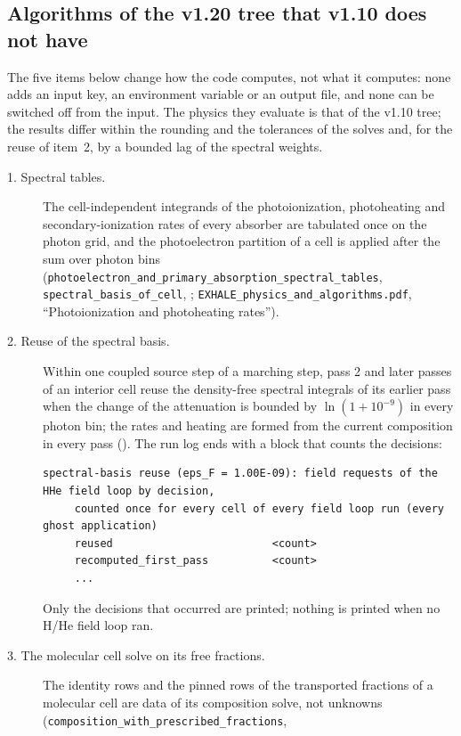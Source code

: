\documentclass[english,a4paper]{my_memo}
\begin{document}
\subsection{Algorithms of the v1.20 tree that v1.10 does not have}
\label{sec:v120-algorithms}

The five items below change how the code computes, not what it computes:
none adds an input key, an environment variable or an output file, and none
can be switched off from the input. The physics they evaluate is that of the
v1.10 tree; the results differ within the rounding and the tolerances of the
solves and, for the reuse of item~2, by a bounded lag of the spectral
weights.
{\sloppy
\begin{description}
\item[1. Spectral tables.] The cell-independent integrands of the
  photoionization, photoheating and secondary-ionization rates of every
  absorber are tabulated once on the photon grid, and the photoelectron
  partition of a cell is applied after the sum over photon bins
  (\texttt{photoelectron\_and\_primary\_absorption\_spectral\_tables},
  \texttt{spectral\_basis\_of\_cell}, ;
  \texttt{EXHALE\_physics\_and\_algorithms.pdf}, ``Photoionization and
  photoheating rates'').
\item[2. Reuse of the spectral basis.] Within one coupled source step of a
  marching step, pass 2 and later passes of an interior cell reuse the
  density-free spectral integrals of its earlier pass when the change of the
  attenuation is bounded by $\ln(1+10^{-9})$ in every photon bin; the rates
  and heating are formed from the current composition in every pass
  (). The run log
  ends with a block that counts the decisions:
\begin{lstlisting}[style=sh]
   spectral-basis reuse (eps_F = 1.00E-09): field requests of the HHe field loop by decision,
     counted once for every cell of every field loop run (every ghost application)
     reused                         <count>
     recomputed_first_pass          <count>
     ...
\end{lstlisting}
  Only the decisions that occurred are printed; nothing is printed when no
  H/He field loop ran.
\item[3. The molecular cell solve on its free fractions.] The identity rows
  and the pinned rows of the transported fractions of a molecular cell are
  data of its composition solve, not unknowns
  (\texttt{composition\_with\_prescribed\_fractions},

\end{description}}
\end{document}
